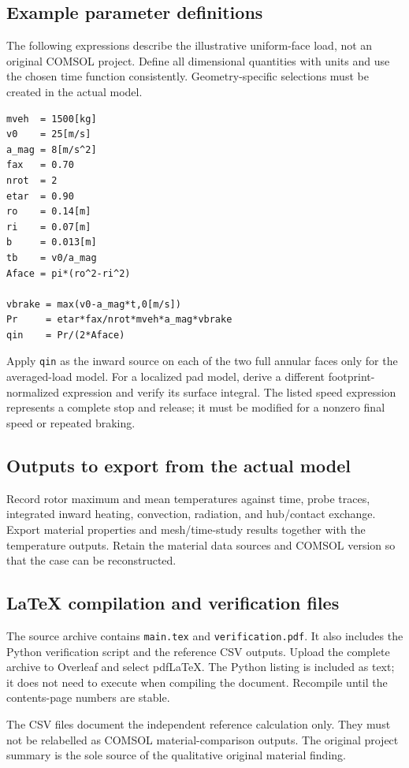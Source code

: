\documentclass[11pt,a4paper]{article}
\begin{document}
\subsection{Example parameter definitions}
The following expressions describe the illustrative uniform-face load, not an original COMSOL project. Define all dimensional quantities with units and use the chosen time function consistently. Geometry-specific selections must be created in the actual model.
\begin{lstlisting}[language={},numbers=none]
mveh  = 1500[kg]
v0    = 25[m/s]
a_mag = 8[m/s^2]
fax   = 0.70
nrot  = 2
etar  = 0.90
ro    = 0.14[m]
ri    = 0.07[m]
b     = 0.013[m]
tb    = v0/a_mag
Aface = pi*(ro^2-ri^2)

vbrake = max(v0-a_mag*t,0[m/s])
Pr     = etar*fax/nrot*mveh*a_mag*vbrake
qin    = Pr/(2*Aface)
\end{lstlisting}
Apply \texttt{qin} as the inward source on each of the two full annular faces only for the averaged-load model. For a localized pad model, derive a different footprint-normalized expression and verify its surface integral. The listed speed expression represents a complete stop and release; it must be modified for a nonzero final speed or repeated braking.

\subsection{Outputs to export from the actual model}
Record rotor maximum and mean temperatures against time, probe traces, integrated inward heating, convection, radiation, and hub/contact exchange. Export material properties and mesh/time-study results together with the temperature outputs. Retain the material data sources and COMSOL version so that the case can be reconstructed.

\subsection{LaTeX compilation and verification files}
The source archive contains \texttt{main.tex} and \texttt{verification.pdf}. It also includes the Python verification script and the reference CSV outputs. Upload the complete archive to Overleaf and select pdfLaTeX. The Python listing is included as text; it does not need to execute when compiling the document. Recompile until the contents-page numbers are stable.

The CSV files document the independent reference calculation only. They must not be relabelled as COMSOL material-comparison outputs. The original project summary is the sole source of the qualitative original material finding.
\end{document}
